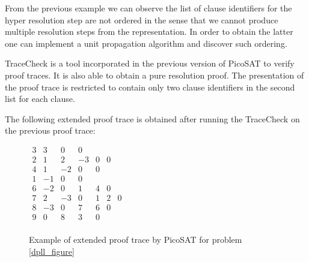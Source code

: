 From the previous example we can observe the list 
of clause identifiers for the hyper resolution step
are not ordered in the sense that we cannot produce
multiple resolution steps from the representation.
In order to obtain the latter one can implement a unit
propagation algorithm and discover such ordering.

TraceCheck is a tool incorporated in the previous version
of PicoSAT \cite{NiemetzPreinerBiere-JSAT15} to verify
proof traces. It is also able to obtain a pure 
resolution proof.
The presentation of the proof trace is restricted to 
contain only two clause identifiers in the second list
for each clause.

\begin{example}
  The following extended proof trace is obtained after running
  the TraceCheck on the previous proof trace:

  \begin{figure}[ht]
    \centering
    $
    \begin{matrix}
      3 &3& 0& 0& \\
      2 &1& 2& -3& 0& 0&\\
      4& 1& -2& 0& 0&\\
      1& -1& 0& 0&\\
      6& -2& 0& 1& 4& 0&\\
      7& 2& -3& 0& 1& 2& 0&\\
      8& -3& 0& 7& 6& 0&\\
      9& 0& 8& 3& 0&\\
    \end{matrix}
    $
    \caption{Example of extended proof trace by PicoSAT for
    problem \ref{dpll_figure}}
  \end{figure}
\end{example}


